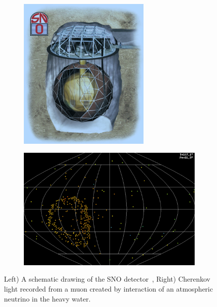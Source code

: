 \begin{figure}[h!]
\centering
\begin{subfigure}{.5\textwidth}
  \centering
\includegraphics[width=0.7\textwidth]{figures/sno.jpeg}
\vspace{2mm}
\end{subfigure}%
\begin{subfigure}{.5\textwidth}
  \centering
\includegraphics[width=\textwidth]{figures/SNOmuonEvent.jpeg}
\vspace{2mm}
\end{subfigure}
\vspace{2mm}
\caption{Left) A schematic drawing of the SNO detector~\cite{Fix6}, Right) Cherenkov light recorded from a muon created by interaction of an atmospheric neutrino in the heavy water.}
\label{fig:SNO}
\end{figure}

